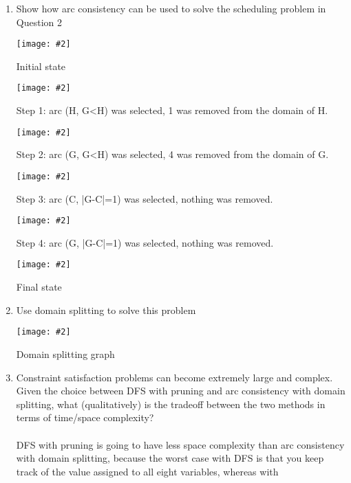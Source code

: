 \documentclass{article}
\def\ans#1{{\color{ans}#1}}
\newcommand{\centerfig}[2]{\begin{center}\texttt{[image: \#2]}\end{center}}
\begin{document}
\begin{enumerate}[label=(\alph*)]
    \item Show how arc consistency can be used to solve the scheduling problem in Question 2
    \centerfig{0.7}{../figs/q3_a_1.jpeg}
    {
        \begin{center}\color{ans}
            Initial state
        \end{center}
    }
    \centerfig{0.7}{../figs/q3_a_2.jpeg}
    {
        \begin{center}\color{ans}
            Step 1: arc (H, G<H) was selected, 1 was removed from the domain of H.
        \end{center}
    }
    \centerfig{0.7}{../figs/q3_a_3.jpeg}
    {
        \begin{center}\color{ans}
            Step 2: arc (G, G<H) was selected, 4 was removed from the domain of G.
        \end{center}
    }
    \centerfig{0.7}{../figs/q3_a_4.jpeg}
    {
        \begin{center}\color{ans}
            Step 3: arc (C, |G-C|=1) was selected, nothing was removed.
        \end{center}
    }
    \centerfig{0.7}{../figs/q3_a_2.jpeg}
    {
        \begin{center}\color{ans}
            Step 4: arc (G, |G-C|=1) was selected, nothing was removed.
        \end{center}
    }
    \centerfig{0.7}{../figs/q3_a_6.jpeg}
    {
        \begin{center}\color{ans}
            Final state
        \end{center}
    }
    \item Use domain splitting to solve this problem
    \centerfig{0.8}{../figs/q3_b.png}
    {
        \begin{center}\color{ans}
            Domain splitting graph
        \end{center}
    }
    \item Constraint satisfaction problems can become extremely large and complex. Given the choice between DFS with pruning and arc consistency with domain splitting, what (qualitatively) is the tradeoff between the two methods in terms of time/space complexity? \\ \\
    \ans{
        DFS with pruning is going to have less space complexity than arc consistency with domain splitting, 
        because the worst case with DFS is that you keep track of the value assigned to all eight variables, whereas with 
}
\end{enumerate}
\end{document}
